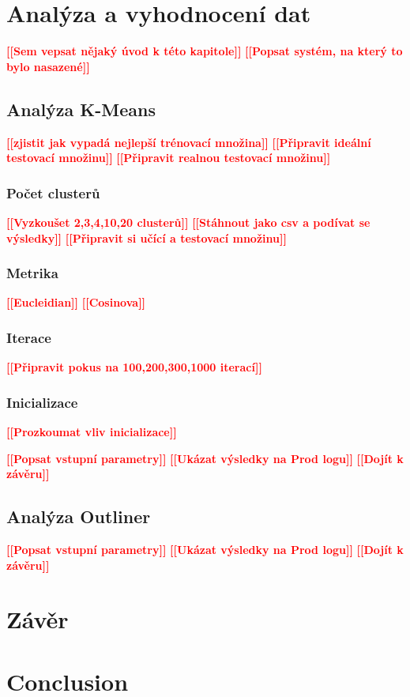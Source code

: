 \documentclass[thesis=M,czech]{FITthesis}[2012/10/20]
\newcommand{\todo}[1]{\textcolor{red}{\textbf{[[#1]]}}}
\newcommand{\blind}[1][1]{\textcolor{gray}{\Blindtext[#1][1]}}
\begin{document}
\chapter{Analýza a vyhodnocení dat}
	\todo{Sem vepsat nějaký úvod k této kapitole}
	\blind[1]
	\todo{Popsat systém, na který to bylo nasazené}
	\blind[1]
	\section{Analýza K-Means}
		\todo{zjistit jak vypadá nejlepší trénovací množina}
		\todo{Připravit ideální testovací množinu}
		\todo{Připravit realnou testovací množinu}
		\subsection{Počet clusterů}
			\todo{Vyzkoušet 2,3,4,10,20 clusterů}
			\todo{Stáhnout jako csv a podívat se výsledky}
			\todo{Připravit si učící a testovací množinu}
		
		\subsection{Metrika}
			\todo{Eucleidian}
			\todo{Cosinova}
			
		\subsection{Iterace}
			\todo{Připravit pokus na 100,200,300,1000 iterací}
			
		\subsection{Inicializace}
			\todo{Prozkoumat vliv inicializace}
	
		\todo{Popsat vstupní parametry}
		\todo{Ukázat výsledky na Prod logu}	
		\todo{Dojít k závěru}						
		\blind[2]
	\section{Analýza Outliner}
		\todo{Popsat vstupní parametry}
		\todo{Ukázat výsledky na Prod logu}	
		\todo{Dojít k závěru}						
		\blind[2]

\chapter{Závěr}

\chapter{Conclusion}
\end{document}
